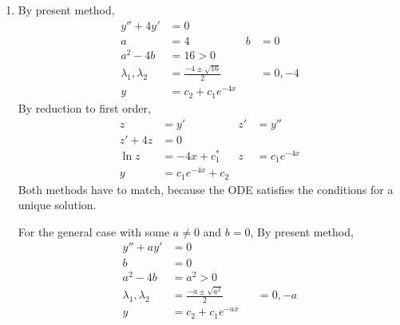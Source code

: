 \begin{enumerate}
\begin{enumerate}
              \item By present method,
                    \begin{align}
                        y'' + 4y'                & = 0                            \\
                        a                        & = 4                          &
                        b                        & = 0                            \\
                        a^{2} - 4b               & = 16 > 0                       \\
                        \lambda_{1}, \lambda_{2} & = \frac{-4 \pm \sqrt{16}}{2} &
                                                 & = 0, -4                        \\
                        y                        & = c_{2} + c_{1}e^{-4x}
                    \end{align}
                    By reduction to first order,
                    \begin{align}
                        z       & = y'                   & z' & = y''          \\
                        z' + 4z & = 0                                          \\
                        \ln z   & = -4x + c_{1}^{*}      & z  & = c_{1}e^{-4x} \\
                        y       & = c_{1}e^{-4x} + c_{2}
                    \end{align}
                    Both methods have to match, because the ODE satisfies the conditions
                    for a unique solution. \par
                    For the general case with some $ a \neq 0 $ and $ b = 0 $,
                    By present method,
                    \begin{align}
                        y'' + ay'                & = 0                               \\
                        b                        & = 0                               \\
                        a^{2} - 4b               & = a^{2} > 0                       \\
                        \lambda_{1}, \lambda_{2} & = \frac{-a \pm \sqrt{a^{2}}}{2} &
                                                 & = 0, -a                           \\
                        y                        & = c_{2} + c_{1}e^{-ax}

\end{align}
\end{enumerate}
\end{enumerate}
